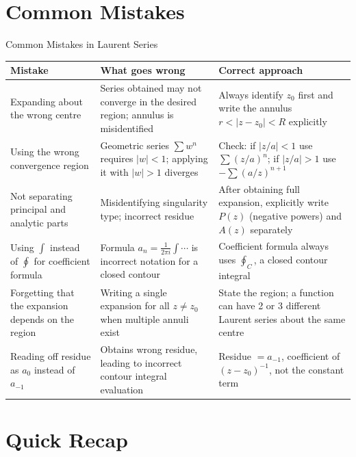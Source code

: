 \documentclass[12pt,a4paper]{article}
\begin{document}
\section{Common Mistakes}

\begin{mistakebox}{Common Mistakes in Laurent Series}
\begin{tabular}{p{4.5cm} p{4.5cm} p{5cm}}
\toprule
\textbf{Mistake} & \textbf{What goes wrong} & \textbf{Correct approach} \\
\midrule
Expanding about the wrong centre
  & Series obtained may not converge in the desired region; annulus is misidentified
  & Always identify $z_0$ first and write the annulus $r<|z-z_0|<R$ explicitly \\
\midrule
Using the wrong convergence region
  & Geometric series $\sum w^n$ requires $|w|<1$; applying it with $|w|>1$ diverges
  & Check: if $|z/a|<1$ use $\sum(z/a)^n$; if $|z/a|>1$ use $-\sum(a/z)^{n+1}$ \\
\midrule
Not separating principal and analytic parts
  & Misidentifying singularity type; incorrect residue
  & After obtaining full expansion, explicitly write $P(z)$ (negative powers) and $A(z)$ separately \\
\midrule
Using $\int$ instead of $\oint$ for coefficient formula
  & Formula $a_n = \frac{1}{2\pi i}\int\cdots$ is incorrect notation for a closed contour
  & Coefficient formula always uses $\oint_C$, a closed contour integral \\
\midrule
Forgetting that the expansion depends on the region
  & Writing a single expansion for all $z\neq z_0$ when multiple annuli exist
  & State the region; a function can have 2 or 3 different Laurent series about the same centre \\
\midrule
Reading off residue as $a_0$ instead of $a_{-1}$
  & Obtains wrong residue, leading to incorrect contour integral evaluation
  & Residue $= a_{-1}$, coefficient of $(z-z_0)^{-1}$, not the constant term \\
\bottomrule
\end{tabular}
\end{mistakebox}

\section{Quick Recap}
\end{document}
